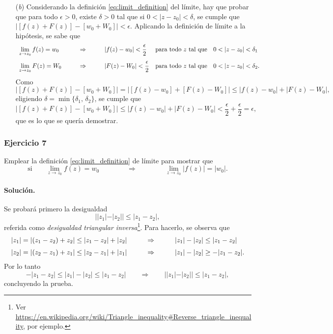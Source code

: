 \documentclass[a4paper]{report}
\begin{document}
\begin{enumerate}
 \item[(\textit{b})] Considerando la definición \ref{eq:limit_definition} del límite, hay que probar que para todo \(\epsilon>0\), existe \(\delta>0\) tal que si \(0<|z-z_0|<\delta\), se cumple que \(|[f(z)+F(z)]-[w_0+W_0]|<\epsilon\). Aplicando la definición de límite a la hipótesis, se sabe que
 \[
 \begin{array}{lllll}
  \lim\limits_{z\to z_0}f(z)=w_0 & \qquad\Rightarrow & \qquad|f(z)-w_0|<\dfrac{\epsilon}{2}&\textrm{para todo }z\textrm{ tal que}&0<|z-z_0|<\delta_1\\[\bigskipamount]
  \lim\limits_{z\to z_0}F(z)=W_0 & \qquad\Rightarrow & \qquad|F(z)-W_0|<\dfrac{\epsilon}{2}&\textrm{para todo }z\textrm{ tal que}&0<|z-z_0|<\delta_2.
 \end{array} 
 \]
 Como
 \[
  |[f(z)+F(z)]-[w_0+W_0]|=|[f(z)-w_0]+[F(z)-W_0]|\leq|f(z)-w_0|+|F(z)-W_0|,
 \]
 eligiendo \(\delta=\min\{\delta_1,\,\delta_2\}\), se cumple que 
 \[
  |[f(z)+F(z)]-[w_0+W_0]|\leq|f(z)-w_0|+|F(z)-W_0|<\frac{\epsilon}{2}+\frac{\epsilon}{2}=\epsilon,
 \]
 que es lo que se quería demostrar.
\end{enumerate}

\subsubsection{Ejercicio 7}

Emplear la definición \ref{eq:limit_definition} de límite para mostrar que 
\[
 \textrm{si}\qquad\lim_{z\to z_0}f(z)=w_0
  \qquad\qquad\Rightarrow\qquad\qquad
 \lim_{z\to z_0}|f(z)|=|w_0|.
\]

\paragraph{Solución.} Se probará primero la desigualdad 
\begin{equation}\label{eq:reverse_trinagle_inequality}
 ||z_1|-|z_2||\leq|z_1-z_2|,
\end{equation}
referida como \emph{desigualdad triangular inversa}\footnote{Ver \url{https://en.wikipedia.org/wiki/Triangle_inequality\#Reverse_triangle_inequality}, por ejemplo.}. Para hacerlo, se observa que 
\[
 \begin{array}{lll}
  |z_1|=|(z_1-z_2)+z_2|\leq|z_1-z_2|+|z_2| & \qquad\Rightarrow &\qquad |z_1|-|z_2|\leq|z_1-z_2|\\[\medskipamount]
  |z_2|=|(z_2-z_1)+z_1|\leq|z_2-z_1|+|z_1| & \qquad\Rightarrow &\qquad |z_1|-|z_2|\geq-|z_1-z_2|.
 \end{array}
\]
Por lo tanto
\[
 -|z_1-z_2|\leq|z_1|-|z_2|\leq|z_1-z_2|\qquad\Rightarrow\qquad ||z_1|-|z_2||\leq|z_1-z_2|,
\]
concluyendo la prueba.
\end{document}

